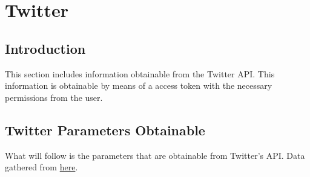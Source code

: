 \documentclass{article}
\begin{document}
\cleardoublepage
\section{Twitter}
\subsection{Introduction}
	This section includes information obtainable from the Twitter API. This information is obtainable by means of a access token with the necessary permissions from the user.

\subsection{Twitter Parameters Obtainable}
	What will follow is the parameters that are obtainable from Twitter's API.
	Data gathered from \href{https://dev.twitter.com/rest/public}{here}.
\end{document}
